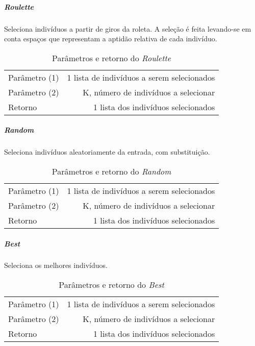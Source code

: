 \subparagraph{Roulette}
Seleciona indivíduos a partir de giros da roleta. A seleção é feita levando-se em conta espaços que representam a aptidão relativa de cada indivíduo.\\

\begin{table}[!h]
  \begin{center}
  \begin{tabular}{|l|r|}
    \hline
    Parâmetro (1) & 1 lista de indivíduos a serem selecionados \\
    Parâmetro (2) & K, número de indivíduos a selecionar \\
    Retorno & 1 lista dos indivíduos selecionados\\
    \hline    
  \end{tabular}
  \end{center}
  \caption{Parâmetros e retorno do {\it Roulette}}
  \label{Roulette}
\end{table}

\subparagraph{Random}
Seleciona indivíduos aleatoriamente da entrada, com substituição. \\

\begin{table}[!h]
  \begin{center}
  \begin{tabular}{|l|r|}
    \hline
    Parâmetro (1) & 1 lista de indivíduos a serem selecionados \\
    Parâmetro (2) & K, número de indivíduos a selecionar \\
    Retorno & 1 lista dos indivíduos selecionados\\
    \hline    
  \end{tabular}
  \end{center}
  \caption{Parâmetros e retorno do {\it Random}}
  \label{Random}
\end{table}

\subparagraph{Best}
Seleciona os melhores indivíduos.\\

\begin{table}[!h]
  \begin{center}
  \begin{tabular}{|l|r|}
    \hline
    Parâmetro (1) & 1 lista de indivíduos a serem selecionados \\
    Parâmetro (2) & K, número de indivíduos a selecionar \\
    Retorno & 1 lista dos indivíduos selecionados\\
    \hline    
  \end{tabular}
  \end{center}
  \caption{Parâmetros e retorno do {\it Best}}
  \label{Best}
\end{table}

